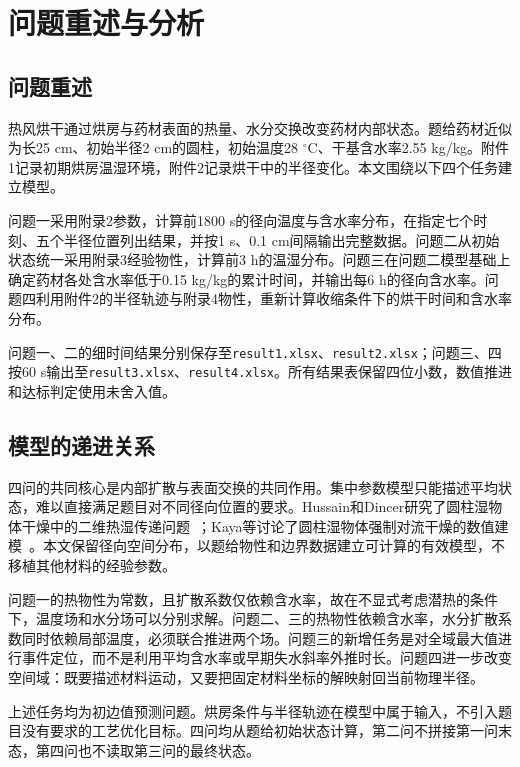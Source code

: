 \section{问题重述与分析}
\subsection{问题重述}
热风烘干通过烘房与药材表面的热量、水分交换改变药材内部状态。题给药材近似为长25 cm、初始半径2 cm的圆柱，初始温度28 $^\circ$C、干基含水率2.55 kg/kg。附件1记录初期烘房温湿环境，附件2记录烘干中的半径变化。本文围绕以下四个任务建立模型。

问题一采用附录2参数，计算前1800 s的径向温度与含水率分布，在指定七个时刻、五个半径位置列出结果，并按1 s、0.1 cm间隔输出完整数据。问题二从初始状态统一采用附录3经验物性，计算前3 h的温湿分布。问题三在问题二模型基础上确定药材各处含水率低于0.15 kg/kg的累计时间，并输出每6 h的径向含水率。问题四利用附件2的半径轨迹与附录4物性，重新计算收缩条件下的烘干时间和含水率分布。

问题一、二的细时间结果分别保存至\texttt{result1.xlsx}、\texttt{result2.xlsx}；问题三、四按60 s输出至\texttt{result3.xlsx}、\texttt{result4.xlsx}。所有结果表保留四位小数，数值推进和达标判定使用未舍入值。

\subsection{模型的递进关系}
四问的共同核心是内部扩散与表面交换的共同作用。集中参数模型只能描述平均状态，难以直接满足题目对不同径向位置的要求。Hussain和Dincer研究了圆柱湿物体干燥中的二维热湿传递问题~\cite{hussain2003}；Kaya等讨论了圆柱湿物体强制对流干燥的数值建模~\cite{kaya2007}。本文保留径向空间分布，以题给物性和边界数据建立可计算的有效模型，不移植其他材料的经验参数。

问题一的热物性为常数，且扩散系数仅依赖含水率，故在不显式考虑潜热的条件下，温度场和水分场可以分别求解。问题二、三的热物性依赖含水率，水分扩散系数同时依赖局部温度，必须联合推进两个场。问题三的新增任务是对全域最大值进行事件定位，而不是利用平均含水率或早期失水斜率外推时长。问题四进一步改变空间域：既要描述材料运动，又要把固定材料坐标的解映射回当前物理半径。

上述任务均为初边值预测问题。烘房条件与半径轨迹在模型中属于输入，不引入题目没有要求的工艺优化目标。四问均从题给初始状态计算，第二问不拼接第一问末态，第四问也不读取第三问的最终状态。

